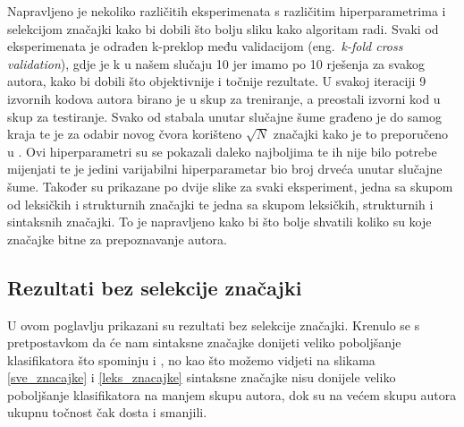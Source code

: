 Napravljeno je nekoliko različitih eksperimenata s različitim hiperparametrima i selekcijom značajki kako bi dobili što bolju sliku kako algoritam radi. Svaki od eksperimenata je odrađen k-preklop među validacijom (eng.~\textit{k-fold cross validation}), gdje je k u našem slučaju 10 jer imamo po 10 rješenja za svakog autora, kako bi dobili što objektivnije i točnije rezultate. U svakoj iteraciji 9 izvornih kodova autora birano je u skup za treniranje, a preostali izvorni kod u skup za testiranje. Svako od stabala unutar slučajne šume građeno je do samog kraja te je za odabir novog čvora korišteno $\sqrt{N}$ značajki kako je to preporučeno u \cite{statisticallearning}. Ovi hiperparametri su se pokazali daleko najboljima te ih nije bilo potrebe mijenjati te je jedini varijabilni hiperparametar bio broj drveća unutar slučajne šume. Također su prikazane po dvije slike za svaki eksperiment, jedna sa skupom od leksičkih i strukturnih značajki te jedna sa skupom leksičkih, strukturnih i sintaksnih značajki. To je napravljeno kako bi što bolje shvatili koliko su koje značajke bitne za prepoznavanje autora.

\subsection{Rezultati bez selekcije značajki}

U ovom poglavlju prikazani su  rezultati bez selekcije značajki. Krenulo se s pretpostavkom da će nam sintaksne značajke donijeti veliko poboljšanje klasifikatora što spominju i \cite{islam}, no kao što možemo vidjeti na slikama \ref{sve_znacajke} i \ref{leks_znacajke} sintaksne značajke nisu donijele veliko poboljšanje klasifikatora na manjem skupu autora, dok su na većem skupu autora ukupnu točnost čak dosta i smanjili. 

